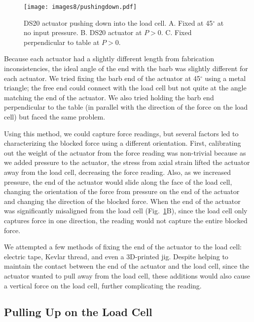 \begin{figure}[!ht]
    \centering
     \texttt{[image: images8/pushingdown.pdf]}
    \caption{DS20 actuator pushing down into the load cell. A. Fixed at 45$^\circ$ at no input pressure. B. DS20 actuator at $P>0$. C. Fixed perpendicular to table at $P>0$.}
    \label{fig:pushingdown}
\end{figure}

\clearpage
Because each actuator had a slightly different length from fabrication inconsistencies, the ideal angle of the end with the barb was slightly different for each actuator. We tried fixing the barb end of the actuator at 45$^\circ$ using a metal triangle; the free end could connect with the load cell but not quite at the angle matching the end of the actuator. We also tried holding the barb end perpendicular to the table (in parallel with the direction of the force on the load cell) but faced the same problem. 

Using this method, we could capture force readings, but several factors led to characterizing the blocked force using a different orientation. First, calibrating out the weight of the actuator from the force reading was non-trivial because as we added pressure to the actuator, the stress from axial strain lifted the actuator away from the load cell, decreasing the force reading. Also, as we increased pressure, the end of the actuator would slide along the face of the load cell, changing the orientation of the force from pressure on the end of the actuator and changing the direction of the blocked force. When the end of the actuator was significantly misaligned from the load cell (Fig.~\ref{fig:pushingdown}B), since the load cell only captures force in one direction, the reading would not capture the entire blocked force. 

We attempted a few methods of fixing the end of the actuator to the load cell: electric tape, Kevlar thread, and even a 3D-printed jig. Despite helping to maintain the contact between the end of the actuator and the load cell, since the actuator wanted to pull away from the load cell, these additions would also cause a vertical force on the load cell, further complicating the reading. 

\clearpage
\subsection{Pulling Up on the Load Cell}

